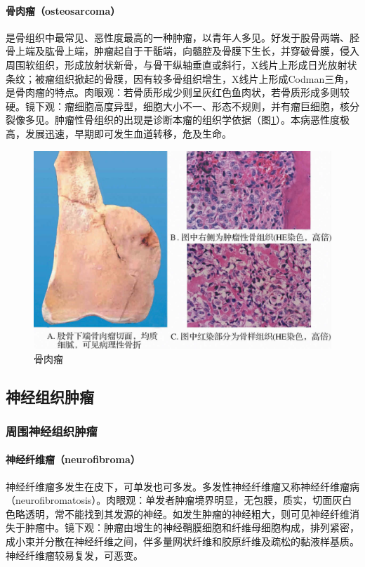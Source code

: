 \paragraph{骨肉瘤（osteosarcoma）}
是骨组织中最常见、恶性度最高的一种肿瘤，以青年人多见。好发于股骨两端、胫骨上端及肱骨上端，肿瘤起自于干骺端，向髓腔及骨膜下生长，并穿破骨膜，侵入周围软组织，形成放射状新骨，与骨干纵轴垂直或斜行，X线片上形成日光放射状条纹；被瘤组织掀起的骨膜，因有较多骨组织增生，X线片上形成Codman三角，是骨肉瘤的特点。肉眼观：若骨质形成少则呈灰红色鱼肉状，若骨质形成多则较硬。镜下观：瘤细胞高度异型，细胞大小不一、形态不规则，并有瘤巨细胞，核分裂像多见。肿瘤性骨组织的出现是诊断本瘤的组织学依据（图\ref{fig5-17}）。本病恶性度极高，发展迅速，早期即可发生血道转移，危及生命。

\begin{figure}[!htbp]
  \centering
  \includegraphics{./images/Image00086.jpg}
  \caption{骨肉瘤}
  \label{fig5-17}
\end{figure}

\subsection{神经组织肿瘤}

\subsubsection{周围神经组织肿瘤}

\paragraph{神经纤维瘤（neurofibroma）}
神经纤维瘤多发生在皮下，可单发也可多发。多发性神经纤维瘤又称神经纤维瘤病（neurofibromatosis）。肉眼观：单发者肿瘤境界明显，无包膜，质实，切面灰白色略透明，常不能找到其发源的神经。如发生肿瘤的神经粗大，则可见神经纤维消失于肿瘤中。镜下观：肿瘤由增生的神经鞘膜细胞和纤维母细胞构成，排列紧密，成小束并分散在神经纤维之间，伴多量网状纤维和胶原纤维及疏松的黏液样基质。神经纤维瘤较易复发，可恶变。

